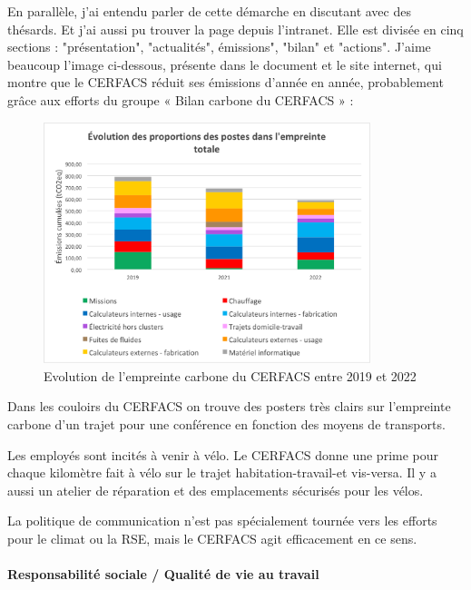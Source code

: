     En parallèle, j'ai entendu parler de cette démarche en discutant avec des thésards. Et j'ai aussi pu trouver la page depuis l'intranet. Elle est divisée en cinq sections : "présentation", "actualités", émissions", "bilan" et "actions".
    J'aime beaucoup l'image ci-dessous, présente dans le document et le site internet, qui montre que le CERFACS réduit ses émissions d'année en année, probablement grâce aux efforts du groupe « Bilan carbone du CERFACS »  : 

    \begin{figure}[H]
        \centering
        \includegraphics[width=0.85\textwidth]{images/evolution_postes_empreintecarbone.png}
        \caption{Evolution de l'empreinte carbone du CERFACS entre 2019 et 2022}
    \end{figure}

    Dans les couloirs du CERFACS on trouve des posters très clairs sur l'empreinte carbone d'un trajet pour une conférence en fonction des moyens de transports.

    Les employés sont incités à venir à vélo. Le CERFACS donne une prime pour chaque kilomètre fait à vélo sur le trajet habitation-travail-et vis-versa. Il y a aussi un atelier de réparation et des emplacements sécurisés pour les vélos.

    La politique de communication n'est pas spécialement tournée vers les efforts pour le climat ou la RSE, mais le CERFACS agit efficacement en ce sens.

\paragraph{Responsabilité sociale / Qualité de vie au travail}
\hspace{0,5cm}

